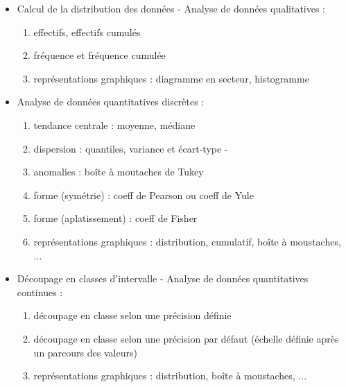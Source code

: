 \begin{itemize}
			\item Calcul de la distribution des données - Analyse de données qualitatives :\\
					\begin{enumerate}
					\item effectifs, effectifs cumulés
					\item fréquence et fréquence cumulée
					\item représentations graphiques : diagramme en secteur, histogramme
					\end{enumerate}
			\item Analyse de données quantitatives discrètes :\\
					\begin{enumerate}
					\item tendance centrale : moyenne, médiane
					\item dispersion : quantiles, variance et écart-type
-					\item anomalies : boîte à moutaches de Tukey
					\item forme (symétrie) : coeff de Pearson ou coeff de Yule
					\item forme (aplatissement) : coeff de Fisher
					\item représentations graphiques : distribution, cumulatif,  boîte à moustaches, ...
					\end{enumerate}
			\item Découpage en classes d'intervalle - Analyse de données quantitatives continues :\\
					\begin{enumerate}
					\item découpage en classe selon une précision définie
					\item découpage en classe selon une précision par défaut (échelle définie après un parcours des valeurs)
					\item représentations graphiques : distribution, boîte à moustaches, ...
					\end{enumerate}
					

\end{itemize}
